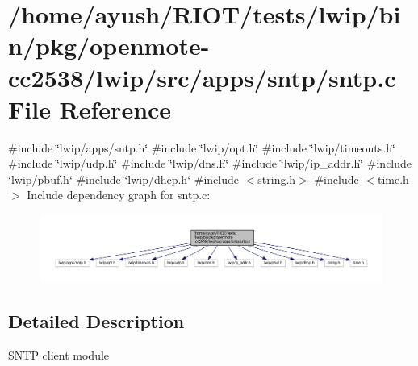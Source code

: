 \hypertarget{openmote-cc2538_2lwip_2src_2apps_2sntp_2sntp_8c}{}\section{/home/ayush/\+R\+I\+O\+T/tests/lwip/bin/pkg/openmote-\/cc2538/lwip/src/apps/sntp/sntp.c File Reference}
\label{openmote-cc2538_2lwip_2src_2apps_2sntp_2sntp_8c}
{\ttfamily \#include \char`\"{}lwip/apps/sntp.\+h\char`\"{}}\newline
{\ttfamily \#include \char`\"{}lwip/opt.\+h\char`\"{}}\newline
{\ttfamily \#include \char`\"{}lwip/timeouts.\+h\char`\"{}}\newline
{\ttfamily \#include \char`\"{}lwip/udp.\+h\char`\"{}}\newline
{\ttfamily \#include \char`\"{}lwip/dns.\+h\char`\"{}}\newline
{\ttfamily \#include \char`\"{}lwip/ip\+\_\+addr.\+h\char`\"{}}\newline
{\ttfamily \#include \char`\"{}lwip/pbuf.\+h\char`\"{}}\newline
{\ttfamily \#include \char`\"{}lwip/dhcp.\+h\char`\"{}}\newline
{\ttfamily \#include $<$string.\+h$>$}\newline
{\ttfamily \#include $<$time.\+h$>$}\newline
Include dependency graph for sntp.\+c\+:
\nopagebreak
\begin{figure}[H]
\begin{center}
\leavevmode
\includegraphics[width=350pt]{openmote-cc2538_2lwip_2src_2apps_2sntp_2sntp_8c__incl}
\end{center}
\end{figure}


\subsection{Detailed Description}
S\+N\+TP client module 